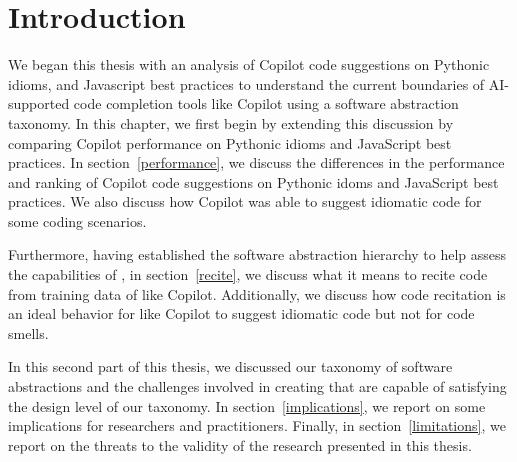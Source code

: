 \label{chapter:discussion}

\section{Introduction}
We began this thesis with an analysis of Copilot code suggestions on Pythonic idioms, and Javascript best practices to understand the current boundaries of AI-supported code completion tools like Copilot using a software abstraction taxonomy. 
In this chapter, we first begin by extending this discussion by comparing Copilot performance on Pythonic idioms and JavaScript best practices. In section~\ref{performance}, we discuss the differences in the performance and ranking of Copilot code suggestions on Pythonic idoms and JavaScript best practices. We also discuss how Copilot was able to suggest idiomatic code for some coding scenarios.

Furthermore, having established the software abstraction hierarchy to help assess the capabilities of \cct{}, 
in section~\ref{recite}, we discuss what it means to recite code from training data of \cct{} like Copilot.
Additionally, we discuss how code recitation is an ideal behavior for \cct{} like Copilot to suggest idiomatic code but not for code smells.

In this second part of this thesis, we discussed our taxonomy of software abstractions and the challenges involved in creating \cct{} that are capable of satisfying the design level of our taxonomy. In section~\ref{implications}, we report on some implications for researchers and practitioners.
Finally, in section~\ref{limitations}, we report on the threats to the validity of the research presented in this thesis.








